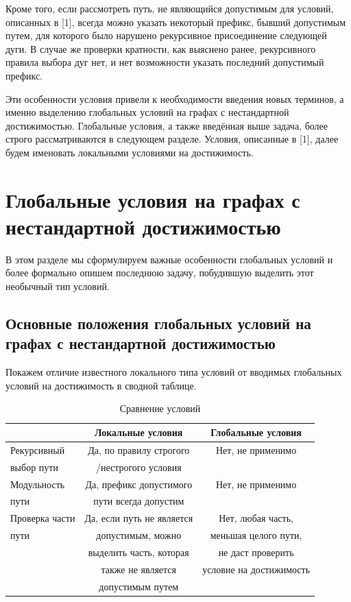 Кроме того, если рассмотреть путь, не являющийся допустимым для условий, описанных в [1], всегда можно указать некоторый префикс, бывший допустимым путем, для которого было нарушено рекурсивное присоединение следующей дуги. В случае же проверки кратности, как выяснено ранее, рекурсивного правила выбора дуг нет, и нет возможности указать последний допустимый префикс.  

Эти особенности условия привели к необходимости введения новых терминов, а именно выделению глобальных условий на графах с нестандартной достижимостью. Глобальные условия, а также введённая выше задача, более строго рассматриваются в следующем разделе. Условия, описанные в [1], далее будем именовать локальными условиями на достижимость.

\section{Глобальные условия на графах с нестандартной достижимостью}

В этом разделе мы сформулируем важные особенности глобальных условий и более формально опишем последнюю задачу, побудившую выделить этот необычный тип условий. 

\subsection{Основные положения глобальных условий на графах с нестандартной достижимостью}

Покажем отличие известного локального типа условий от вводимых глобальных условий на достижимость в сводной таблице.

\begin{table}[h]
	\begin{tabular}{l | c | c }
		& Локальные условия & Глобальные условия \\
		\hline \hline
		Рекурсивный            & Да, по правилу строгого    & Нет, не применимо \\
		выбор пути			   & /нестрогого условия	    & \\
		\hline \hline
		Модульность            & Да, префикс допустимого    & Нет, не применимо \\
		пути			       & пути всегда допустим       & \\
		\hline \hline
		Проверка части         & Да, если путь не является  & Нет, любая часть, \\
		пути			       & допустимым, можно 			& меньшая целого пути, \\
		& выделить часть, которая    & не даст проверить \\
		& также не является      	& условие на достижимость \\
		& допустимым путем
	\end{tabular}
	\caption{Сравнение условий}
	\label{tabl:Compare}
\end{table}

